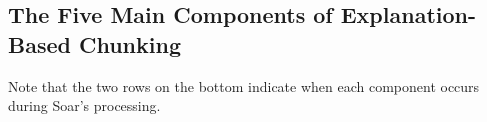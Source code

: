 \vspace{12pt}
\begin{center}
	\captionsetup{type=figure}
	\centering{}
	\caption{}
	\label{fig:chunking-trace-identity}
\end{center}

\subsection{The Five Main Components of Explanation-Based Chunking}

\vspace{12pt}
\begin{center}
	\captionsetup{type=figure}
	\centering{}
	\caption{Note that the two rows on the bottom indicate when each component occurs during Soar's processing.}
	\label{fig:chunking-ebc-components}
\end{center}

